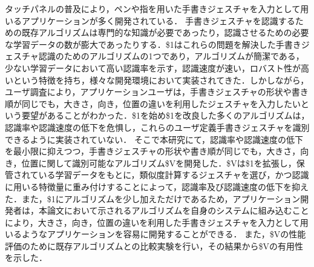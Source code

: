 タッチパネルの普及により，ペンや指を用いた手書きジェスチャを入力として用いるアプリケーションが多く開発されている．
手書きジェスチャを認識するための既存アルゴリズムは専門的な知識が必要であったり，認識させるための必要な学習データの数が膨大であったりする．\$1はこれらの問題を解決した手書きジェスチャ認識のためのアルゴリズムの1つであり，アルゴリズムが簡潔である，少ない学習データにおいて高い認識率を示す，認識速度が速い，ロバスト性が高いという特徴を持ち，様々な開発環境において実装されてきた．しかしながら，ユーザ調査により，アプリケーションユーザは，手書きジェスチャの形状や書き順が同じでも，大きさ，向き，位置の違いを利用したジェスチャを入力したいという要望があることがわかった．\$1を始め\$1を改良した多くのアルゴリズムは，認識率や認識速度の低下を危惧し，これらのユーザ定義手書きジェスチャを識別できるように実装されていない．
そこで本研究にて，認識率や認識速度の低下を最小限に抑えつつ，手書きジェスチャの形状や書き順が同じでも，大きさ，向き，位置に関して識別可能なアルゴリズム\$Vを開発した．\$Vは\$1を拡張し，保管されている学習データをもとに，類似度計算するジェスチャを選び，かつ認識に用いる特徴量に重み付けすることによって，認識率及び認識速度の低下を抑えた．また，\$1にアルゴリズムを少し加えただけであるため，アプリケーション開発者は，本論文において示されるアルゴリズムを自身のシステムに組み込むことにより，大きさ，向き，位置の違いを利用した手書きジェスチャを入力として用いるようなアプリケーションを容易に開発することができる．
また，\$Vの性能評価のために既存アルゴリズムとの比較実験を行い，その結果から\$Vの有用性を示した．